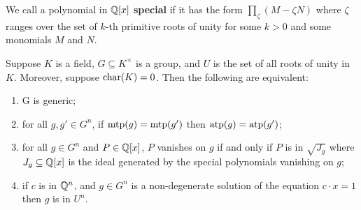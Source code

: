 \noindent We call a polynomial in $\mathbb{Q}[x]$ {\bf special} if it has the form $\prod_\zeta (M- \zeta N)$ where $\zeta$ ranges over the set of $k$-th primitive roots of unity for some $k>0$ and some monomials $M$ and $N$.


\begin{prop}\label{GenericEquivalence}
Suppose $K$ is a field, $G \subseteq K^\times $ is a group, and $U$ is the set of all roots of unity in $K$. Moreover, suppose \(\mathrm{char}(K)=0  \). Then the following are equivalent:
\begin{enumerate}
\item G is generic;
\item for all \(g, g' \in G^n\), if \(\mathrm{mtp}(g)= \mathrm{mtp}(g') \) then \(\mathrm{atp}(g)=\mathrm{atp}(g') \); 
\item for all $g \in G^n$ and $P \in \mathbb{Q}[x]$, $P$ vanishes on $g$ if and only if $P$ is in $\sqrt{J_g}$ where $J_g \subseteq  \mathbb{Q}[x]$ is the ideal generated by the special polynomials vanishing on $g$;

\item if $c$ is in $\mathbb{Q}^n$, and $g \in G^n$ is a non-degenerate solution of the equation $ c\cdot x =1 $ then $g$ is in $U^n$.


\end{enumerate}
\end{prop}

